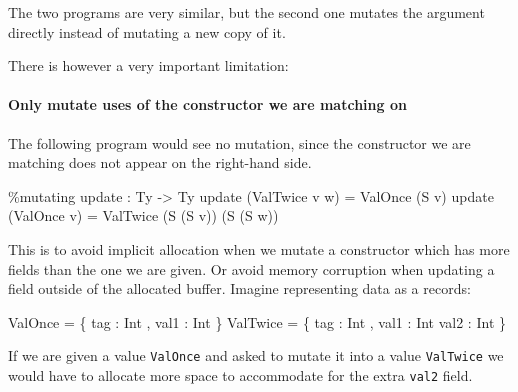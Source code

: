 \documentclass[
]{article}
\newenvironment{Shaded}{}{}
\newcommand{\DataTypeTok}[1]{\textcolor[rgb]{0.56,0.13,0.00}{#1}}
\newcommand{\NormalTok}[1]{#1}
\newcommand{\OperatorTok}[1]{\textcolor[rgb]{0.40,0.40,0.40}{#1}}
\newcommand{\OtherTok}[1]{\textcolor[rgb]{0.00,0.44,0.13}{#1}}
\begin{document}
The two programs are very similar, but the second one mutates the
argument directly instead of mutating a new copy of it.

There is however a very important limitation:

\hypertarget{only-mutate-uses-of-the-constructor-we-are-matching-on}{%
\paragraph{Only mutate uses of the constructor we are matching
on}\label{only-mutate-uses-of-the-constructor-we-are-matching-on}}

The following program would see no mutation, since the constructor we
are matching does not appear on the right-hand side.

\begin{Shaded}
\begin{Highlighting}[]
\OperatorTok{\%}\NormalTok{mutating}
\NormalTok{update }\OperatorTok{:} \DataTypeTok{Ty} \OtherTok{{-}\textgreater{}} \DataTypeTok{Ty}
\NormalTok{update (}\DataTypeTok{ValTwice}\NormalTok{ v w) }\OtherTok{=} \DataTypeTok{ValOnce}\NormalTok{ (}\DataTypeTok{S}\NormalTok{ v)}
\NormalTok{update (}\DataTypeTok{ValOnce}\NormalTok{ v) }\OtherTok{=} \DataTypeTok{ValTwice}\NormalTok{ (}\DataTypeTok{S}\NormalTok{ (}\DataTypeTok{S}\NormalTok{ v)) (}\DataTypeTok{S}\NormalTok{ (}\DataTypeTok{S}\NormalTok{ w))}
\end{Highlighting}
\end{Shaded}

This is to avoid implicit allocation when we mutate a constructor which
has more fields than the one we are given. Or avoid memory corruption
when updating a field outside of the allocated buffer. Imagine
representing data as a records:

\begin{Shaded}
\begin{Highlighting}[]
\DataTypeTok{ValOnce} \OtherTok{=}\NormalTok{ \{ tag }\OperatorTok{:} \DataTypeTok{Int}\NormalTok{ , val1 }\OperatorTok{:} \DataTypeTok{Int}\NormalTok{ \}}
\DataTypeTok{ValTwice} \OtherTok{=}\NormalTok{ \{ tag }\OperatorTok{:} \DataTypeTok{Int}\NormalTok{ , val1 }\OperatorTok{:} \DataTypeTok{Int}\NormalTok{ val2 }\OperatorTok{:} \DataTypeTok{Int}\NormalTok{ \}}
\end{Highlighting}
\end{Shaded}

If we are given a value \texttt{ValOnce} and asked to mutate it into a
value \texttt{ValTwice} we would have to allocate more space to
accommodate for the extra \texttt{val2} field.
\end{document}
